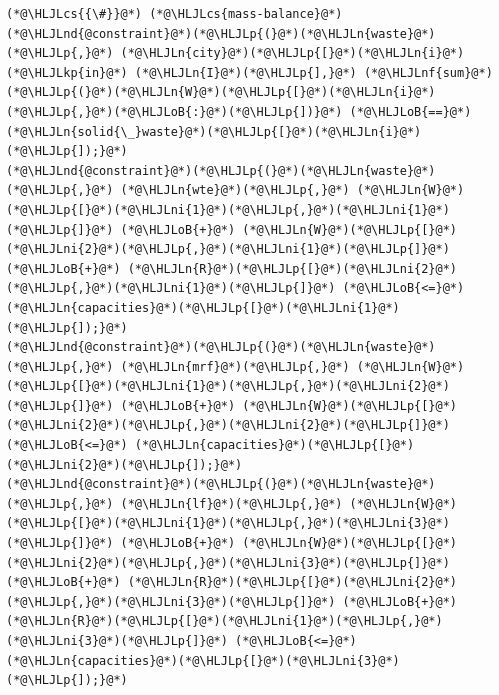 \documentclass[12pt,a4paper]{article}
\newcommand{\HLJLkp}[1]{\textcolor[RGB]{148,91,176}{\textbf{#1}}}
\newcommand{\HLJLn}[1]{#1}
\newcommand{\HLJLnd}[1]{\textcolor[RGB]{214,102,97}{#1}}
\newcommand{\HLJLnf}[1]{\textcolor[RGB]{66,102,213}{#1}}
\newcommand{\HLJLni}[1]{\textcolor[RGB]{59,151,46}{#1}}
\newcommand{\HLJLoB}[1]{\textcolor[RGB]{102,102,102}{\textbf{#1}}}
\newcommand{\HLJLp}[1]{#1}
\newcommand{\HLJLcs}[1]{\textcolor[RGB]{153,153,119}{\textit{#1}}}
\begin{document}
\begin{lstlisting}
(*@\HLJLcs{{\#}}@*) (*@\HLJLcs{mass-balance}@*)
(*@\HLJLnd{@constraint}@*)(*@\HLJLp{(}@*)(*@\HLJLn{waste}@*)(*@\HLJLp{,}@*) (*@\HLJLn{city}@*)(*@\HLJLp{[}@*)(*@\HLJLn{i}@*) (*@\HLJLkp{in}@*) (*@\HLJLn{I}@*)(*@\HLJLp{],}@*) (*@\HLJLnf{sum}@*)(*@\HLJLp{(}@*)(*@\HLJLn{W}@*)(*@\HLJLp{[}@*)(*@\HLJLn{i}@*)(*@\HLJLp{,}@*)(*@\HLJLoB{:}@*)(*@\HLJLp{])}@*) (*@\HLJLoB{==}@*) (*@\HLJLn{solid{\_}waste}@*)(*@\HLJLp{[}@*)(*@\HLJLn{i}@*)(*@\HLJLp{]);}@*)
(*@\HLJLnd{@constraint}@*)(*@\HLJLp{(}@*)(*@\HLJLn{waste}@*)(*@\HLJLp{,}@*) (*@\HLJLn{wte}@*)(*@\HLJLp{,}@*) (*@\HLJLn{W}@*)(*@\HLJLp{[}@*)(*@\HLJLni{1}@*)(*@\HLJLp{,}@*)(*@\HLJLni{1}@*)(*@\HLJLp{]}@*) (*@\HLJLoB{+}@*) (*@\HLJLn{W}@*)(*@\HLJLp{[}@*)(*@\HLJLni{2}@*)(*@\HLJLp{,}@*)(*@\HLJLni{1}@*)(*@\HLJLp{]}@*) (*@\HLJLoB{+}@*) (*@\HLJLn{R}@*)(*@\HLJLp{[}@*)(*@\HLJLni{2}@*)(*@\HLJLp{,}@*)(*@\HLJLni{1}@*)(*@\HLJLp{]}@*) (*@\HLJLoB{<=}@*) (*@\HLJLn{capacities}@*)(*@\HLJLp{[}@*)(*@\HLJLni{1}@*)(*@\HLJLp{]);}@*)
(*@\HLJLnd{@constraint}@*)(*@\HLJLp{(}@*)(*@\HLJLn{waste}@*)(*@\HLJLp{,}@*) (*@\HLJLn{mrf}@*)(*@\HLJLp{,}@*) (*@\HLJLn{W}@*)(*@\HLJLp{[}@*)(*@\HLJLni{1}@*)(*@\HLJLp{,}@*)(*@\HLJLni{2}@*)(*@\HLJLp{]}@*) (*@\HLJLoB{+}@*) (*@\HLJLn{W}@*)(*@\HLJLp{[}@*)(*@\HLJLni{2}@*)(*@\HLJLp{,}@*)(*@\HLJLni{2}@*)(*@\HLJLp{]}@*)  (*@\HLJLoB{<=}@*) (*@\HLJLn{capacities}@*)(*@\HLJLp{[}@*)(*@\HLJLni{2}@*)(*@\HLJLp{]);}@*)
(*@\HLJLnd{@constraint}@*)(*@\HLJLp{(}@*)(*@\HLJLn{waste}@*)(*@\HLJLp{,}@*) (*@\HLJLn{lf}@*)(*@\HLJLp{,}@*) (*@\HLJLn{W}@*)(*@\HLJLp{[}@*)(*@\HLJLni{1}@*)(*@\HLJLp{,}@*)(*@\HLJLni{3}@*)(*@\HLJLp{]}@*) (*@\HLJLoB{+}@*) (*@\HLJLn{W}@*)(*@\HLJLp{[}@*)(*@\HLJLni{2}@*)(*@\HLJLp{,}@*)(*@\HLJLni{3}@*)(*@\HLJLp{]}@*) (*@\HLJLoB{+}@*) (*@\HLJLn{R}@*)(*@\HLJLp{[}@*)(*@\HLJLni{2}@*)(*@\HLJLp{,}@*)(*@\HLJLni{3}@*)(*@\HLJLp{]}@*) (*@\HLJLoB{+}@*) (*@\HLJLn{R}@*)(*@\HLJLp{[}@*)(*@\HLJLni{1}@*)(*@\HLJLp{,}@*)(*@\HLJLni{3}@*)(*@\HLJLp{]}@*) (*@\HLJLoB{<=}@*) (*@\HLJLn{capacities}@*)(*@\HLJLp{[}@*)(*@\HLJLni{3}@*)(*@\HLJLp{]);}@*)


\end{lstlisting}
\end{document}
